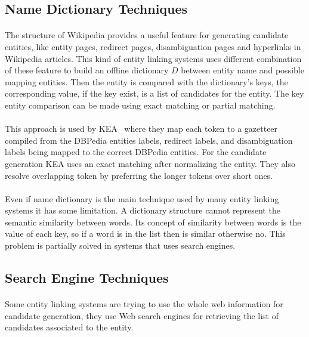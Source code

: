 \subsection{Name Dictionary Techniques}
\paragraph{}
The structure of Wikipedia provides a useful feature for generating candidate entities, like entity pages, redirect pages, disambiguation pages and hyperlinks in Wikipedia articles. This kind of entity linking systems uses different combination of these feature to build an offline dictionary $D$ between entity name and possible mapping entities. Then the entity is compared with the dictionary's keys, the corresponding value, if the key exist, is a list of candidates for the entity. The key entity comparison can be made using exact matching or partial matching. 

\paragraph{}
This approach is used by KEA~\cite{waitelonisnamed} where they map each token to a gazetteer compiled from the DBPedia entities labels, redirect labels, and disambiguation labels being mapped to the correct DBPedia entities. For the candidate generation KEA uses an exact matching  after normalizing the entity. They also resolve overlapping token by preferring the longer tokens over short ones.

\paragraph{}
Even if name dictionary is the main technique used by many entity linking systems it has some limitation. A dictionary structure cannot represent the semantic similarity between words. Its concept of similarity between words is the value of each key, so if a word is in the list then is similar otherwise no. This problem is partially solved in systems that uses search engines.

\subsection{Search Engine Techniques}
\paragraph{}
Some entity linking systems are trying to use the whole web information for candidate generation, they use Web search engines for retrieving the list of candidates associated to the entity.

